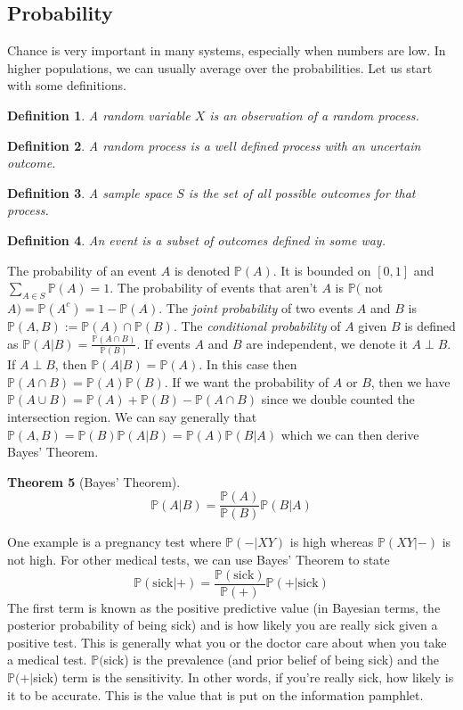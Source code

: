 \documentclass{article}
\newcommand{\p}{\mathbb{P}}
\newtheorem{definition}{Definition}[section]
\newtheorem{theorem}[definition]{Theorem}
\begin{document}
\subsection{Probability}
Chance is very important in many systems, especially when numbers are low. In higher populations, we can usually average over the probabilities. Let us start with some definitions. 
\begin{definition}
    A \emph{random variable $X$} is an observation of a random process.
\end{definition}
\begin{definition}
    A \emph{random process} is a well defined process with an uncertain outcome.
\end{definition}
\begin{definition}
    A \emph{sample space} $S$ is the set of all possible outcomes for that process.
\end{definition}
\begin{definition}
    An event is a subset of outcomes defined in some way.
\end{definition}
The probability of an event $A$ is denoted $\p (A)$. It is bounded on $[0,1]$ and $\displaystyle{\sum_{A\in S} \p(A)}=1$. The probability of events that aren't $A$ is $\p ($ not $A) = \p (A^c)=1-\p(A)$. The \emph{joint probability} of two events $A$ and $B$ is $\p (A,B):= \p(A) \cap \p(B)$. The \emph{conditional probability} of $A$ given $B$ is defined as $\p(A|B) =\frac{\p(A\cap B)}{\p(B)}$. If events $A$ and $B$ are independent, we denote it $A\perp B$. If $A \perp B$, then $\p(A|B) = \p(A)$. In this case then $\p (A\cap B) = \p (A)\p(B)$. If we want the probability of $A$ or $B$, then we have $\p(A\cup B) = \p (A) + \p(B) -\p(A\cap B)$ since we double counted the intersection region. We can say generally that $\p(A,B) = \p(B)\p(A|B) =\p(A)\p(B|A)$ which we can then derive Bayes' Theorem.
\begin{theorem}[Bayes' Theorem]
    \begin{equation*}
        \p(A|B)  = \frac{\p(A)}{\p(B)} \p(B|A)
    \end{equation*}
\end{theorem}
One example is a pregnancy test where $\p (-|XY)$ is high whereas $\p(XY|-)$ is not high. For other medical tests, we can use Bayes' Theorem to state 
\begin{equation*}
    \p(\text{sick}|+) = \frac{\p(\text{sick})}{\p(+)}\p(+|\text{sick})
\end{equation*}
The first term is known as the positive predictive value (in Bayesian terms, the posterior probability of being sick) and is how likely you are really sick given a positive test. This is generally what you or the doctor care about when you take a medical test. $\p ($sick) is the prevalence (and prior belief of being sick) and the $\p(+|$sick) term is the sensitivity. In other words, if you're really sick, how likely is it to be accurate. This is the value that is put on the information pamphlet. 
\end{document}
